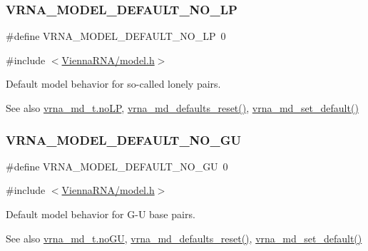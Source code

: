 \subsubsection{\texorpdfstring{VRNA\_MODEL\_DEFAULT\_NO\_LP}{VRNA\_MODEL\_DEFAULT\_NO\_LP}}
{\footnotesize\ttfamily \#define V\+R\+N\+A\+\_\+\+M\+O\+D\+E\+L\+\_\+\+D\+E\+F\+A\+U\+L\+T\+\_\+\+N\+O\+\_\+\+LP~0}



{\ttfamily \#include $<$\mbox{\hyperlink{model_8h}{Vienna\+R\+N\+A/model.\+h}}$>$}



Default model behavior for so-\/called \textquotesingle{}lonely pairs\textquotesingle{}. 

\begin{DoxySeeAlso}{See also}
\mbox{\hyperlink{group__model__details_a753200bf21cee0ea2df64afe43999f5d}{vrna\+\_\+md\+\_\+t.\+no\+LP}}, \mbox{\hyperlink{group__model__details_ga70834424cf804d149937de89f80ceb45}{vrna\+\_\+md\+\_\+defaults\+\_\+reset()}}, \mbox{\hyperlink{group__model__details_ga8ac6ff84936282436f822644bf841f66}{vrna\+\_\+md\+\_\+set\+\_\+default()}} 
\end{DoxySeeAlso}
\mbox{\label{group__model__details_ga34702f7d14d38b877ba8e475281e97e2}} 
\subsubsection{\texorpdfstring{VRNA\_MODEL\_DEFAULT\_NO\_GU}{VRNA\_MODEL\_DEFAULT\_NO\_GU}}
{\footnotesize\ttfamily \#define V\+R\+N\+A\+\_\+\+M\+O\+D\+E\+L\+\_\+\+D\+E\+F\+A\+U\+L\+T\+\_\+\+N\+O\+\_\+\+GU~0}



{\ttfamily \#include $<$\mbox{\hyperlink{model_8h}{Vienna\+R\+N\+A/model.\+h}}$>$}



Default model behavior for G-\/U base pairs. 

\begin{DoxySeeAlso}{See also}
\mbox{\hyperlink{group__model__details_ad64a5eaf9c4550e7525b36a725fec4b2}{vrna\+\_\+md\+\_\+t.\+no\+GU}}, \mbox{\hyperlink{group__model__details_ga70834424cf804d149937de89f80ceb45}{vrna\+\_\+md\+\_\+defaults\+\_\+reset()}}, \mbox{\hyperlink{group__model__details_ga8ac6ff84936282436f822644bf841f66}{vrna\+\_\+md\+\_\+set\+\_\+default()}} 
\end{DoxySeeAlso}
\mbox{\label{group__model__details_ga5308de46faaca4b9fd16045864901ee7}} 
